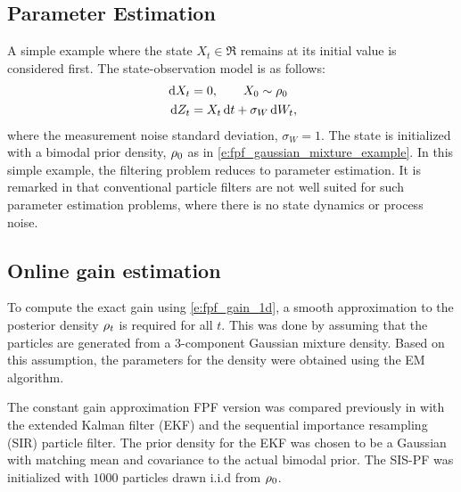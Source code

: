 \subsection{Parameter Estimation }
\label{s:param_estimation} %
A simple example where the state $X_t \in \Re$ remains at its initial value is considered first.
The state-observation model is as follows:
\[
\begin{aligned}
\,\textmd{d} X_t&=0, \qquad X_0 \sim \rho_0\\
\,\textmd{d} Z_t&= X_t \,\textmd{d} t+\sigma_{W}\,\textmd{d} W_t,
\end{aligned}
\]
where the measurement noise standard deviation, $\sigma_{W} = 1$. The state is initialized with a bimodal prior density, $\rho_0$ as in \eqref{e:fpf_gaussian_mixture_example}. 
In this simple example, the filtering problem reduces to parameter estimation. It is remarked in \cite{arumasgorcla02} that conventional particle filters are not well suited for such parameter estimation problems, where there is no state dynamics or process noise.
%
\subsection*{Online gain estimation}
To compute the exact gain using \eqref{e:fpf_gain_1d}, a smooth approximation to the posterior density $\rho_t$ is required for all $t$. This was done by assuming that the particles are generated from a  3-component Gaussian mixture density. Based on this assumption, the parameters for the density were obtained using the EM algorithm.

The constant gain approximation FPF  version was compared previously in \cite{tilghiomeh13} with the extended Kalman filter (EKF) and the  sequential importance resampling (SIR) particle filter. The prior density for the EKF was chosen to be a Gaussian with matching mean and covariance to the actual bimodal prior. The SIS-PF was   initialized with $1000$ particles drawn i.i.d from $\rho_0$.

